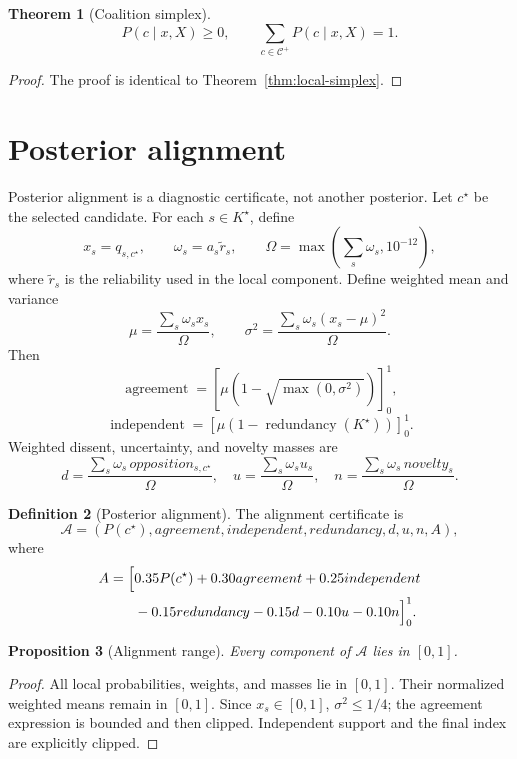 \documentclass[11pt]{article}
\theoremstyle{definition}
\newtheorem{definition}{Definition}[section]
\theoremstyle{plain}
\newtheorem{theorem}[definition]{Theorem}
\newtheorem{proposition}[definition]{Proposition}
\newcommand{\clip}[3]{\left[#1\right]_{#2}^{#3}}
\begin{document}
\begin{theorem}[Coalition simplex]
\label{thm:coalition-simplex}
\[
P(c\mid x,X)\ge0,\qquad
\sum_{c\in\mathcal C^+}P(c\mid x,X)=1.
\]
\end{theorem}

\begin{proof}
The proof is identical to Theorem~\ref{thm:local-simplex}.
\end{proof}

\section{Posterior alignment}

Posterior alignment is a diagnostic certificate, not another posterior.
Let $c^\star$ be the selected candidate.  For each $s\in K^\star$, define
\[
x_s=q_{s,c^\star},\qquad
\omega_s=a_s\widetilde r_s,\qquad
\Omega=\max\left(\sum_s\omega_s,10^{-12}\right),
\]
where $\widetilde r_s$ is the reliability used in the local component.
Define weighted mean and variance
\[
\mu=\frac{\sum_s\omega_sx_s}{\Omega},
\qquad
\sigma^2=\frac{\sum_s\omega_s(x_s-\mu)^2}{\Omega}.
\]
Then
\[
\operatorname{agreement}
=\clip{\mu(1-\sqrt{\max(0,\sigma^2)})}{0}{1},
\]
\[
\operatorname{independent}
=\clip{\mu(1-\operatorname{redundancy}(K^\star))}{0}{1}.
\]
Weighted dissent, uncertainty, and novelty masses are
\[
d=\frac{\sum_s\omega_s\,opposition_{s,c^\star}}{\Omega},
\quad
u=\frac{\sum_s\omega_su_s}{\Omega},
\quad
n=\frac{\sum_s\omega_s\,novelty_s}{\Omega}.
\]

\begin{definition}[Posterior alignment]
The alignment certificate is
\[
\mathcal A=
(P(c^\star),agreement,independent,redundancy,d,u,n,A),
\]
where
\[
\begin{aligned}
A=\Bigl[
&0.35P(c^\star)+0.30agreement+0.25independent\\
&-0.15redundancy-0.15d-0.10u-0.10n
\Bigr]_{0}^{1}.
\end{aligned}
\]
\end{definition}

\begin{proposition}[Alignment range]
\label{prop:alignment}
Every component of $\mathcal A$ lies in $[0,1]$.
\end{proposition}

\begin{proof}
All local probabilities, weights, and masses lie in $[0,1]$.  Their normalized
weighted means remain in $[0,1]$.  Since $x_s\in[0,1]$, $\sigma^2\le1/4$;
the agreement expression is bounded and then clipped.  Independent support
and the final index are explicitly clipped.
\end{proof}
\end{document}
